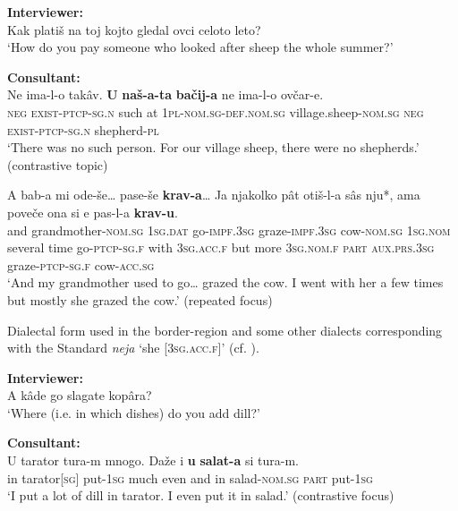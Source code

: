 \documentclass[output=paper,colorlinks,citecolor=brown]{langscibook}
\begin{document}
\begin{exe}
	\ex \label{05ex16}
	\textbf{Interviewer:} \\
	Kak platiš na toj kojto gledal ovci celoto leto? \\
	‘How do you pay someone who looked after sheep the whole summer?’
	
	\medskip
	
	\textbf{Consultant:} \\
	\gll Ne ima-l-o takâv. \textbf{U} \textbf{naš-a-ta} \textbf{bačij-a} ne ima-l-o ovčar-e. \\
	\textsc{neg} \textsc{exist-ptcp-sg.n} such at \textsc{1pl}-\textsc{nom.sg-def.nom.sg} village.sheep-\textsc{nom.sg} \textsc{neg} \textsc{exist-ptcp-sg.n} shepherd-\textsc{pl} \\
	\trans ‘There was no such person. For our village sheep, there were no shepherds.’ \hfill (contrastive topic)
\end{exe}


\begin{exe}
	\ex \label{05ex17}
	\gll A bab-a mi ode-še… pase-še \textbf{krav-a}… Ja njakolko pât otiš-l-a sâs nju*, ama poveče ona si e pas-l-a \textbf{krav-u}. \\
	and grandmother-\textsc{nom.sg} \textsc{1sg.dat} go-\textsc{impf.3sg} graze-\textsc{impf.3sg} cow-\textsc{nom.sg} \textsc{1sg.nom} several time go-\textsc{ptcp-sg.f} with \textsc{3sg.acc.f} but more \textsc{3sg.nom.f} \textsc{part} \textsc{aux.prs.3sg} graze\textsc{-ptcp-sg.f} cow\textsc{-acc.sg} \\
	\trans ‘And my grandmother used to go… grazed the cow. I went with her a few times but mostly she grazed the cow.’ \hfill (repeated focus)
\end{exe}

{\footnotesize *Dialectal form used in the border-region and some other dialects corresponding with the Standard  \textit{neja} ‘she [\textsc{3sg.acc.f}]’ (cf. \citealt[82]{todorov2002}).}

\begin{exe}
	\ex \label{05ex18}
	\textbf{Interviewer:} \\
	A kâde go slagate kopâra? \\
	‘Where (i.e. in which dishes) do you add dill?’
	
	\medskip
	
	\textbf{Consultant:} \\
	\gll U tarator tura-m mnogo. Daže i \textbf{u} \textbf{salat-a} si tura-m. \\
	in tarator[\textsc{sg}] put-\textsc{1sg} much even and in salad-\textsc{nom.sg} \textsc{part} put-\textsc{1sg} \\
	\trans ‘I put a lot of dill in tarator. I even put it in salad.’ \hfill (contrastive focus)
\end{exe}
\end{document}

